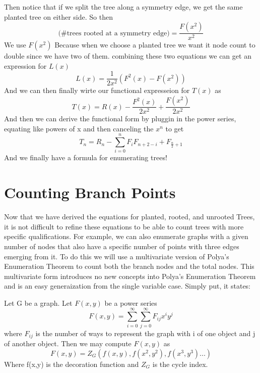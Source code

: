 \documentclass{article}
\begin{document}
Then notice that if we split the tree along a symmetry edge, we get the same planted tree on either side. So then 
\begin{equation}
\text{(\# trees rooted at a symmetry edge)}=\frac{F(x^2)}{x^2}
\end{equation}
We use \(F(x^2)\)  Because when we choose a planted tree we want it node count to double since we have two of them. combining these two equations we can get an expression for \(L(x)\)
\begin{equation}
L(x)= \frac{1}{2x^2}(F^2(x)-F(x^2))
\end{equation}
And we can then finally wirte our functional expresseion for \(T(x)\) as
\begin{equation}
T(x)=R(x) -\frac{F^2(x)}{2x^2}+\frac{F(x^2)}{2x^2}
\end{equation}
And then we can derive the functional form by pluggin in the power series, equating like powers of x and then canceling the \(x^n\) to get
\begin{equation}
T_n=R_n-\sum_{i=0}^nF_iF_{n+2-i} + F_{\frac{n}{2}+1}
\end{equation}
And we finally have a formula for enumerating trees!

\section{Counting Branch Points}
Now that we have derived the equations for planted, rooted, and unrooted Trees, it is not difficult to refine these equations to be able to count trees with more specific qualifications. For example, we can also enumerate graphs with a given number of nodes that also have a specific number of points with three edges emerging from it. To do this we will use a multivariate version of Polya's Enumeration Theorem to count both the branch nodes and the total nodes. This multivariate form introduces no new concepts into Polya's Enumeration Theorem and is an easy generaization from the single variable case. Simply put, it states:

Let G be a graph. Let \(F(x,y)\) be a power series 
\begin{equation}
F(x,y)=\sum_{i=0}^\infty \sum_{j=0}^\infty F_{ij} x^iy^j
\end{equation}
where \(F_{ij}\) is the number of ways to represent the graph with i of one object and j of another object. Then we may compute \(F(x,y)\) as
\begin{equation}
F(x,y)=Z_G(f(x,y),f(x^2,y^2),f(x^3,y^3)...)
\end{equation}
Where f(x,y) is the decoration function and \(Z_G\) is the cycle index. 
\end{document}
